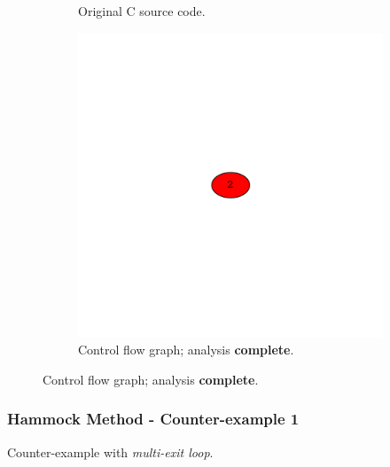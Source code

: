 \begin{figure}[htbp]
	\centering
	\begin{subfigure}[b]{0.48\textwidth}
		\centering
		
		\caption{Original C source code.}
	\end{subfigure}
	\begin{subfigure}[b]{0.50\textwidth}
		\centering
		\includegraphics[width=\textwidth]{inc/appendices/examples/hammock/example/without-break/main_0004b.png}
		\caption{Control flow graph; analysis \textbf{complete}.}
	\end{subfigure}
\end{figure}


\clearpage

\subsubsection{Hammock Method - Counter-example 1}

Counter-example with \textit{multi-exit loop}.

